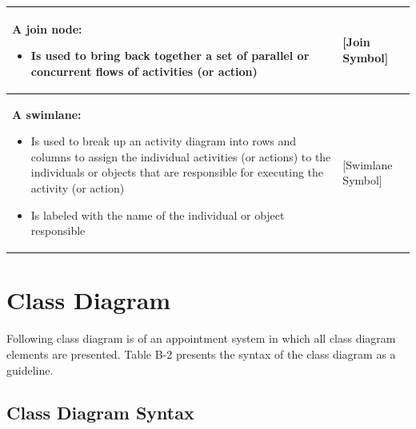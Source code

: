 \documentclass[12pt,a4paper]{report}
\begin{document}
\begin{longtable}{|p{8cm}|p{4cm}|}
\textbf{A join node:} \newline
\begin{itemize}
    \item Is used to bring back together a set of parallel or concurrent flows of activities (or action)
\end{itemize} & [Join Symbol] \\
\hline

\textbf{A swimlane:} \newline
\begin{itemize}
    \item Is used to break up an activity diagram into rows and columns to assign the individual activities (or actions) to the individuals or objects that are responsible for executing the activity (or action)
    \item Is labeled with the name of the individual or object responsible
\end{itemize} & [Swimlane Symbol] \\
\hline

\end{longtable}

\section{Class Diagram}

Following class diagram is of an appointment system in which all class diagram elements are presented. Table B-2 presents the syntax of the class diagram as a guideline.

\subsection*{Class Diagram Syntax}
\end{document}
